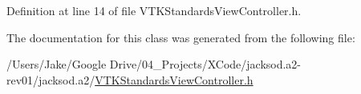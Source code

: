Definition at line 14 of file V\+T\+K\+Standards\+View\+Controller.\+h.



The documentation for this class was generated from the following file\+:\begin{DoxyCompactItemize}
\item 
/\+Users/\+Jake/\+Google Drive/04\+\_\+\+Projects/\+X\+Code/jacksod.\+a2-\/rev01/jacksod.\+a2/\hyperlink{_v_t_k_standards_view_controller_8h}{V\+T\+K\+Standards\+View\+Controller.\+h}\end{DoxyCompactItemize}
